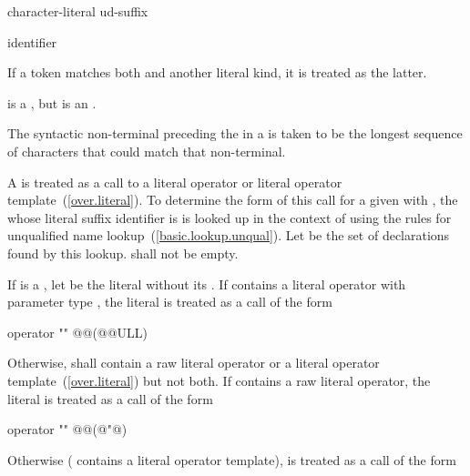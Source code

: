 \begin{bnf}
\br
    character-literal ud-suffix
\end{bnf}

\begin{bnf}
\br
    identifier
\end{bnf}

\pnum
If a token matches both  and another literal kind, it
is treated as the latter. \begin{example} 
is a , but  is an
. \end{example}
The syntactic non-terminal preceding the  in a
 is taken to be the longest sequence of
characters that could match that non-terminal.

\pnum
A  is treated as a call to a literal operator or
literal operator template~(\ref{over.literal}). To determine the form of this call for a
given   with  ,
the  whose literal suffix identifier is  is
looked up in the context of  using the rules for unqualified name
lookup~(\ref{basic.lookup.unqual}). Let  be the set of declarations found by
this lookup.  shall not be empty.

\pnum
If  is a , let  be the literal
without its . If  contains a literal operator with
parameter type , the literal  is treated as a call of
the form

\begin{codeblock}
operator "" @@(@@ULL)
\end{codeblock}

Otherwise,  shall contain a raw literal operator or a literal operator
template~(\ref{over.literal}) but not both. If  contains a raw literal operator,
the literal  is treated as a call of the form

\begin{codeblock}
operator "" @@(@"@)
\end{codeblock}

Otherwise ( contains a literal operator template),  is treated as a call
of the form



